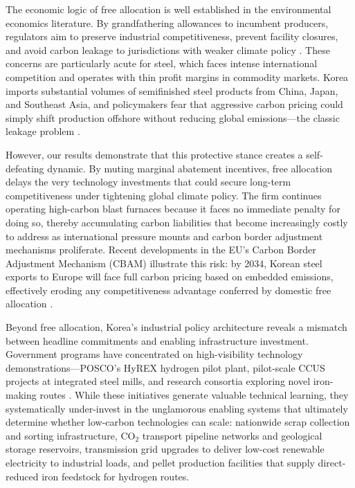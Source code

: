 \documentclass[preprint,1p,authoryear]{elsarticle}
\begin{document}
The economic logic of free allocation is well established in the environmental economics literature. By grandfathering allowances to incumbent producers, regulators aim to preserve industrial competitiveness, prevent facility closures, and avoid carbon leakage to jurisdictions with weaker climate policy \citep{demailly2018european, fowlie2016carbon}. These concerns are particularly acute for steel, which faces intense international competition and operates with thin profit margins in commodity markets. Korea imports substantial volumes of semifinished steel products from China, Japan, and Southeast Asia, and policymakers fear that aggressive carbon pricing could simply shift production offshore without reducing global emissions—the classic leakage problem \citep{jarke2017carbon}.

However, our results demonstrate that this protective stance creates a self-defeating dynamic. By muting marginal abatement incentives, free allocation delays the very technology investments that could secure long-term competitiveness under tightening global climate policy. The firm continues operating high-carbon blast furnaces because it faces no immediate penalty for doing so, thereby accumulating carbon liabilities that become increasingly costly to address as international pressure mounts and carbon border adjustment mechanisms proliferate. Recent developments in the EU's Carbon Border Adjustment Mechanism (CBAM) illustrate this risk: by 2034, Korean steel exports to Europe will face full carbon pricing based on embedded emissions, effectively eroding any competitiveness advantage conferred by domestic free allocation \citep{wang2021carbon}.

Beyond free allocation, Korea's industrial policy architecture reveals a mismatch between headline commitments and enabling infrastructure investment. Government programs have concentrated on high-visibility technology demonstrations—POSCO's HyREX hydrogen pilot plant, pilot-scale CCUS projects at integrated steel mills, and research consortia exploring novel iron-making routes \citep{POSCO2023SR, KOSA2024Yearbook}. While these initiatives generate valuable technical learning, they systematically under-invest in the unglamorous enabling systems that ultimately determine whether low-carbon technologies can scale: nationwide scrap collection and sorting infrastructure, CO$_2$ transport pipeline networks and geological storage reservoirs, transmission grid upgrades to deliver low-cost renewable electricity to industrial loads, and pellet production facilities that supply direct-reduced iron feedstock for hydrogen routes.
\end{document}
